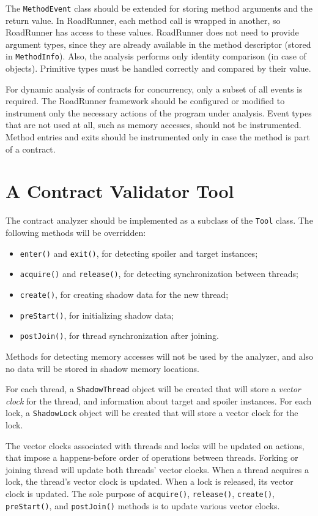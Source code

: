 The \texttt{MethodEvent} class should be extended for storing method arguments
and the return value. In RoadRunner, each method call is wrapped in another, so
RoadRunner has access to these values. RoadRunner does not need to provide
argument types, since they are already available in the method descriptor
(stored in \texttt{MethodInfo}). Also, the analysis performs only identity
comparison (in case of objects). Primitive types must be handled correctly and
compared by their value.

For dynamic analysis of contracts for concurrency, only a subset of all events
is required. The RoadRunner framework should be configured or modified to
instrument only the necessary actions of the program under analysis. Event types
that are not used at all, such as memory accesses, should not be instrumented.
Method entries and exits should be instrumented only in case the method is part
of a contract.

\section{A Contract Validator Tool}

The contract analyzer should be implemented as a subclass of the \texttt{Tool}
class. The following methods will be overridden:
\begin{itemize}
    \item \texttt{enter()} and \texttt{exit()}, for detecting spoiler and target
        instances;
    \item \texttt{acquire()} and \texttt{release()}, for detecting
        synchronization between threads;
    \item \texttt{create()}, for creating shadow data for the new thread;
    \item \texttt{preStart()}, for initializing shadow data;
    \item \texttt{postJoin()}, for thread synchronization after joining.
\end{itemize}

Methods for detecting memory accesses will not be used by the analyzer, and also
no data will be stored in shadow memory locations.

For each thread, a \texttt{ShadowThread} object will be created that will store
a \emph{vector clock} for the thread, and information about target and spoiler
instances. For each lock, a \texttt{ShadowLock} object will be created that will
store a vector clock for the lock.

The vector clocks associated with threads and locks will be updated on actions,
that impose a happens-before order of operations between threads. Forking or
joining thread will update both threads' vector clocks. When a thread acquires a
lock, the thread's vector clock is updated. When a lock is released, its vector
clock is updated. The sole purpose of \texttt{acquire()}, \texttt{release()},
\texttt{create()}, \texttt{preStart()}, and \texttt{postJoin()} methods is to
update various vector clocks.

